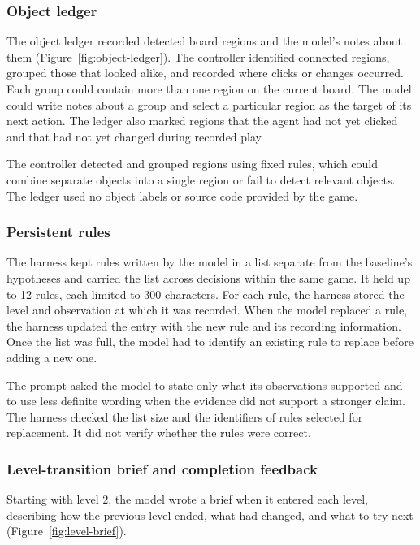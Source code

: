 \subsubsection{Object ledger}
The object ledger recorded detected board regions and the model’s notes about them (Figure~\ref{fig:object-ledger}). The controller identified connected regions, grouped those that looked alike, and recorded where clicks or changes occurred. Each group could contain more than one region on the current board. The model could write notes about a group and select a particular region as the target of its next action. The ledger also marked regions that the agent had not yet clicked and that had not yet changed during recorded play.

The controller detected and grouped regions using fixed rules, which could combine separate objects into a single region or fail to detect relevant objects. The ledger used no object labels or source code provided by the game.



\subsubsection{Persistent rules}
The harness kept rules written by the model in a list separate from the baseline's hypotheses and carried the list across decisions within the same game. It held up to 12 rules, each limited to 300 characters. For each rule, the harness stored the level and observation at which it was recorded. When the model replaced a rule, the harness updated the entry with the new rule and its recording information. Once the list was full, the model had to identify an existing rule to replace before adding a new one.

The prompt asked the model to state only what its observations supported and to use less definite wording when the evidence did not support a stronger claim. The harness checked the list size and the identifiers of rules selected for replacement. It did not verify whether the rules were correct.

\subsubsection{Level-transition brief and completion feedback}
Starting with level 2, the model wrote a brief when it entered each level, describing how the previous level ended, what had changed, and what to try next (Figure~\ref{fig:level-brief}).

